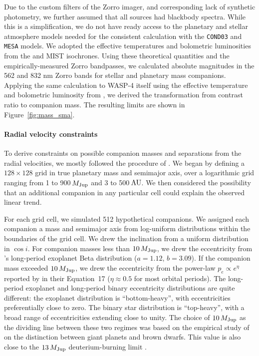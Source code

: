 \documentclass[12pt,twocolumn,tighten]{aastex62}
\begin{document}
Due to the custom filters of the Zorro imager, and corresponding lack
of synthetic photometry, we further assumed that all sources had
blackbody spectra. While this is a simplification, we do not
have ready access to the planetary and stellar atmosphere models
needed for the consistent calculation with the \texttt{COND03} and
\texttt{MESA} models.  We adopted the effective temperatures
and bolometric luminosities from the \citet{baraffe_evolutionary_2003}
and MIST isochrones.  Using these theoretical quantities and the
empirically-measured Zorro bandpasses, we calculated absolute
magnitudes in the 562 and 832 nm Zorro bands for stellar and planetary
mass companions.  Applying the same calculation to WASP-4 itself using
the effective temperature and bolometric luminosity from
, we derived the transformation from
contrast ratio to companion mass.  The resulting limits are shown in
Figure~\ref{fig:mass_sma}.

\paragraph{Radial velocity constraints}

To derive constraints on possible companion masses and separations
from the radial velocities, we mostly followed the procedure of
\citet{bryan_excess_2019}. We began by defining a $128\times128$ grid in true planetary mass and
semimajor axis, over a logarithmic grid ranging from 1 to 900$\,$$M_{\rm
Jup}$ and 3 to 500$\,$${\rm AU}$.  We then considered the possibility
that an additional companion in any particular cell could explain the
observed linear trend.

For each grid cell, we simulated 512 hypothetical
companions. We assigned each companion a mass and semimajor axis from log-uniform
distributions within the boundaries of the grid cell. We drew the inclination from a
uniform distribution in $\cos i$.  For companion masses less than
$10\,M_{\rm Jup}$, we drew the eccentricity from
\citet{kipping_beta_2013}'s long-period exoplanet Beta distribution
($a=1.12$, $b=3.09$).  If the companion mass exceeded $10\,M_{\rm
Jup}$, we drew the eccentricity from the power-law $p_e \propto
e^\eta$ reported by \citet{moe_mind_2017} in their Equation~17 ($\eta
\approx 0.5$ for most orbital periods).  The long-period exoplanet and
long-period binary eccentricity distributions are quite different: the
exoplanet distribution is ``bottom-heavy'', with eccentricities
preferentially close to zero.  The binary star distribution is
``top-heavy'', with a broad range of eccentricities extending close to unity.
The choice of $10\,M_{\rm Jup}$ as the dividing line between these two regimes was based on the
empirical study of \citet{schlaufman_evidence_2018} on the distinction between giant
planets and brown dwarfs. This value is also close to the
$13\,M_{\rm Jup}$ deuterium-burning limit \citep[{\it
e.g.},][]{burrows_nongray_1997}.
\end{document}
